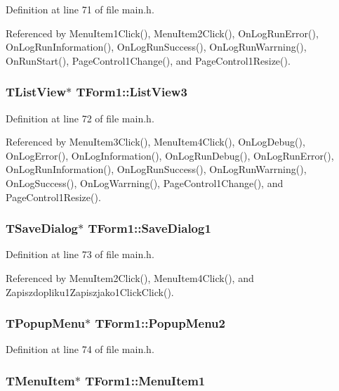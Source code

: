 Definition at line 71 of file main.h.

Referenced by MenuItem1Click(), MenuItem2Click(), OnLogRunError(), OnLogRunInformation(), OnLogRunSuccess(), OnLogRunWarrning(), OnRunStart(), PageControl1Change(), and PageControl1Resize().\hypertarget{classTForm1_2ebb9796da3f2296c14d506af21d929e}{
\subsubsection[ListView3]{\setlength{\rightskip}{0pt plus 5cm}TListView$\ast$ {\bf TForm1::ListView3}}}
\label{classTForm1_2ebb9796da3f2296c14d506af21d929e}




Definition at line 72 of file main.h.

Referenced by MenuItem3Click(), MenuItem4Click(), OnLogDebug(), OnLogError(), OnLogInformation(), OnLogRunDebug(), OnLogRunError(), OnLogRunInformation(), OnLogRunSuccess(), OnLogRunWarrning(), OnLogSuccess(), OnLogWarrning(), PageControl1Change(), and PageControl1Resize().\hypertarget{classTForm1_69479cd188c830cd26b871bc9d1bec6b}{
\subsubsection[SaveDialog1]{\setlength{\rightskip}{0pt plus 5cm}TSaveDialog$\ast$ {\bf TForm1::SaveDialog1}}}
\label{classTForm1_69479cd188c830cd26b871bc9d1bec6b}




Definition at line 73 of file main.h.

Referenced by MenuItem2Click(), MenuItem4Click(), and Zapiszdopliku1Zapiszjako1ClickClick().\hypertarget{classTForm1_183d2be2116d1bd81ba3265063cd7862}{
\subsubsection[PopupMenu2]{\setlength{\rightskip}{0pt plus 5cm}TPopupMenu$\ast$ {\bf TForm1::PopupMenu2}}}
\label{classTForm1_183d2be2116d1bd81ba3265063cd7862}




Definition at line 74 of file main.h.\hypertarget{classTForm1_fa2b3db47d8e6084396230ca1faacae1}{
\subsubsection[MenuItem1]{\setlength{\rightskip}{0pt plus 5cm}TMenuItem$\ast$ {\bf TForm1::MenuItem1}}}
\label{classTForm1_fa2b3db47d8e6084396230ca1faacae1}




